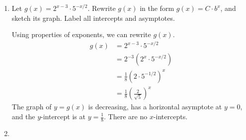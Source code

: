 \documentclass{article}
\begin{document}
\begin{enumerate}
\begin{enumerate}[resume]
\begin{solution}
      Based on our graph, the global maximum could occur at at $x=\pm1$ or at the endpoints,
      $x=\pm2$. We need to compare the $y$-values at these points by plugging in the $x$-values
      to $f(x)$. We'll just find $f(1)$ and $f(2)$. Since $f$ is even, 
      we know $f(-1)=f(1)$ and $f(-2)=f(2)$. 
      \begin{align*}
        f(1) &= |g(2)| = |(2)^3-12(2)|= 16 \\
        f(2) &= |g(4)| = |(4)^3-12(4)| = 16
      \end{align*}
      Since all of these $y$-values are equal,
      the global maximum is attained at , and the maximum value is .
    \end{solution}

  \end{enumerate}

\item 

  \begin{problem}[\vfill\newpage]
    Let $g(x) = 2^{x - 3} \cdot 5^{-x/2}$. Rewrite $g(x)$ in the form $g(x) = C \cdot b^x$, and sketch its graph. Label all intercepts and asymptotes. 
  \end{problem}

  \begin{solution}
    Using properties of exponents, we can rewrite $g(x)$.
    \begin{align*}
      g(x) &= 2^{x-3}\cdot 5^{-x/2} \\
      &= 2^{-3}(2^x \cdot 5^{-x/2}) \\
      &= \tfrac{1}{8}(2 \cdot 5^{-1/2})^x \\
      &= \tfrac{1}{8}(\tfrac{2}{\sqrt{5}})^x
    \end{align*}
    The graph of $y=g(x)$ is decreasing, has a horizontal asymptote at $y=0$, and
    the $y$-intercept is at $y=\frac{1}{8}$. There are no $x$-intercepts.
    \begin{center}
    \end{center}
  \end{solution}

\item 


\end{enumerate}
\end{document}
